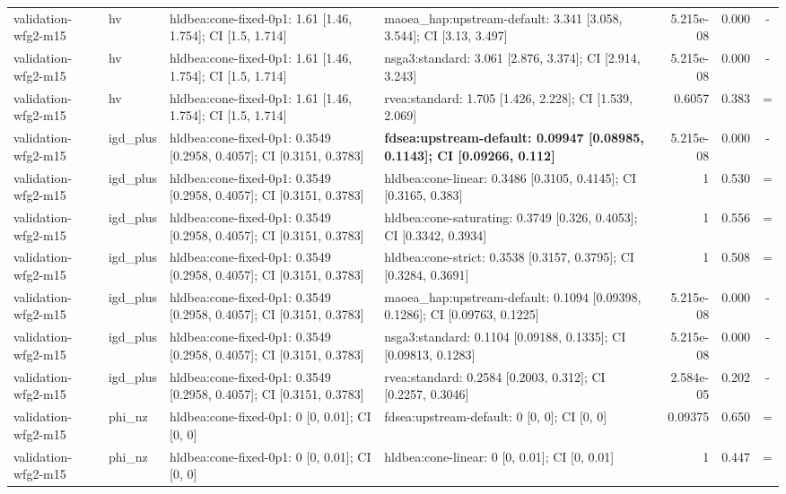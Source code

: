 \begin{tabular}{llllrrc}
validation-wfg2-m15 & hv & hldbea:cone-fixed-0p1: 1.61 [1.46, 1.754]; CI [1.5, 1.714] & maoea\_hap:upstream-default: 3.341 [3.058, 3.544]; CI [3.13, 3.497] & 5.215e-08 & 0.000 & - \\
validation-wfg2-m15 & hv & hldbea:cone-fixed-0p1: 1.61 [1.46, 1.754]; CI [1.5, 1.714] & nsga3:standard: 3.061 [2.876, 3.374]; CI [2.914, 3.243] & 5.215e-08 & 0.000 & - \\
validation-wfg2-m15 & hv & hldbea:cone-fixed-0p1: 1.61 [1.46, 1.754]; CI [1.5, 1.714] & rvea:standard: 1.705 [1.426, 2.228]; CI [1.539, 2.069] & 0.6057 & 0.383 & = \\
validation-wfg2-m15 & igd\_plus & hldbea:cone-fixed-0p1: 0.3549 [0.2958, 0.4057]; CI [0.3151, 0.3783] & \textbf{fdsea:upstream-default: 0.09947 [0.08985, 0.1143]; CI [0.09266, 0.112]} & 5.215e-08 & 0.000 & - \\
validation-wfg2-m15 & igd\_plus & hldbea:cone-fixed-0p1: 0.3549 [0.2958, 0.4057]; CI [0.3151, 0.3783] & hldbea:cone-linear: 0.3486 [0.3105, 0.4145]; CI [0.3165, 0.383] & 1 & 0.530 & = \\
validation-wfg2-m15 & igd\_plus & hldbea:cone-fixed-0p1: 0.3549 [0.2958, 0.4057]; CI [0.3151, 0.3783] & hldbea:cone-saturating: 0.3749 [0.326, 0.4053]; CI [0.3342, 0.3934] & 1 & 0.556 & = \\
validation-wfg2-m15 & igd\_plus & hldbea:cone-fixed-0p1: 0.3549 [0.2958, 0.4057]; CI [0.3151, 0.3783] & hldbea:cone-strict: 0.3538 [0.3157, 0.3795]; CI [0.3284, 0.3691] & 1 & 0.508 & = \\
validation-wfg2-m15 & igd\_plus & hldbea:cone-fixed-0p1: 0.3549 [0.2958, 0.4057]; CI [0.3151, 0.3783] & maoea\_hap:upstream-default: 0.1094 [0.09398, 0.1286]; CI [0.09763, 0.1225] & 5.215e-08 & 0.000 & - \\
validation-wfg2-m15 & igd\_plus & hldbea:cone-fixed-0p1: 0.3549 [0.2958, 0.4057]; CI [0.3151, 0.3783] & nsga3:standard: 0.1104 [0.09188, 0.1335]; CI [0.09813, 0.1283] & 5.215e-08 & 0.000 & - \\
validation-wfg2-m15 & igd\_plus & hldbea:cone-fixed-0p1: 0.3549 [0.2958, 0.4057]; CI [0.3151, 0.3783] & rvea:standard: 0.2584 [0.2003, 0.312]; CI [0.2257, 0.3046] & 2.584e-05 & 0.202 & - \\
validation-wfg2-m15 & phi\_nz & hldbea:cone-fixed-0p1: 0 [0, 0.01]; CI [0, 0] & fdsea:upstream-default: 0 [0, 0]; CI [0, 0] & 0.09375 & 0.650 & = \\
validation-wfg2-m15 & phi\_nz & hldbea:cone-fixed-0p1: 0 [0, 0.01]; CI [0, 0] & hldbea:cone-linear: 0 [0, 0.01]; CI [0, 0.01] & 1 & 0.447 & = \\

\end{tabular}
